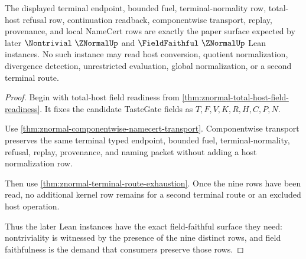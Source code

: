 \begin{theorem}
\label{thm:znormal-terminal-tastegate-readiness}
The displayed terminal endpoint, bounded fuel, terminal-normality row, total-host refusal row, continuation readback, componentwise transport, replay, provenance, and local NameCert rows are exactly the paper surface expected by later $\Nontrivial\ \ZNormalUp$ and $\FieldFaithful\ \ZNormalUp$ Lean instances. No such instance may read host conversion, quotient normalization, divergence detection, unrestricted evaluation, global normalization, or a second terminal route.
\end{theorem}
\begin{proof}
Begin with total-host field readiness from \autoref{thm:znormal-total-host-field-readiness}. It fixes the candidate TasteGate fields as $T,F,V,K,R,H,C,P,N$.

Use \autoref{thm:znormal-componentwise-namecert-transport}. Componentwise transport preserves the same terminal typed endpoint, bounded fuel, terminal-normality, refusal, replay, provenance, and naming packet without adding a host normalization row.

Then use \autoref{thm:znormal-terminal-route-exhaustion}. Once the nine rows have been read, no additional kernel row remains for a second terminal route or an excluded host operation.

Thus the later Lean instances have the exact field-faithful surface they need: nontriviality is witnessed by the presence of the nine distinct rows, and field faithfulness is the demand that consumers preserve those rows.
\end{proof}

